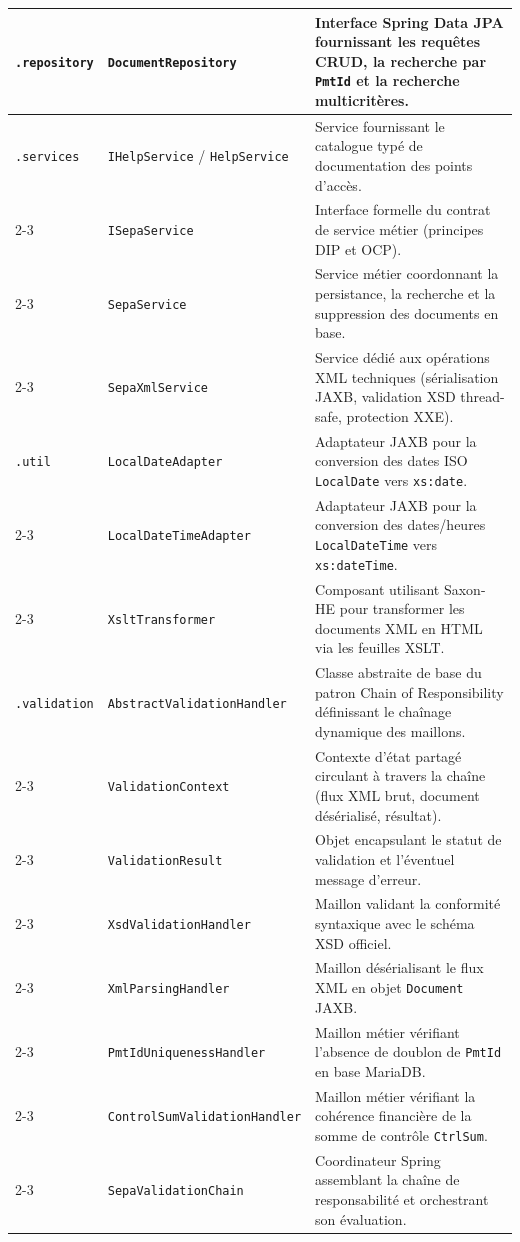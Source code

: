 \documentclass[12pt,a4paper]{article}
\begin{document}
\begin{longtable}{|p{3.8cm}|p{4.6cm}|p{6.8cm}|}
    \texttt{.repository} & \texttt{DocumentRepository} & Interface Spring Data JPA fournissant les requêtes CRUD, la recherche par \texttt{PmtId} et la recherche multicritères. \\
    \hline

    \texttt{.services} & \texttt{IHelpService} / \texttt{HelpService} & Service fournissant le catalogue typé de documentation des points d'accès. \\
    \cline{2-3}
    & \texttt{ISepaService} & Interface formelle du contrat de service métier (principes DIP et OCP). \\
    \cline{2-3}
    & \texttt{SepaService} & Service métier coordonnant la persistance, la recherche et la suppression des documents en base. \\
    \cline{2-3}
    & \texttt{SepaXmlService} & Service dédié aux opérations XML techniques (sérialisation JAXB, validation XSD thread-safe, protection XXE). \\
    \hline

    \texttt{.util} & \texttt{LocalDateAdapter} & Adaptateur JAXB pour la conversion des dates ISO \texttt{LocalDate} vers \texttt{xs:date}. \\
    \cline{2-3}
    & \texttt{LocalDateTimeAdapter} & Adaptateur JAXB pour la conversion des dates/heures \texttt{LocalDateTime} vers \texttt{xs:dateTime}. \\
    \cline{2-3}
    & \texttt{XsltTransformer} & Composant utilisant Saxon-HE pour transformer les documents XML en HTML via les feuilles XSLT. \\
    \hline

    \texttt{.validation} & \texttt{AbstractValidationHandler} & Classe abstraite de base du patron Chain of Responsibility définissant le chaînage dynamique des maillons. \\
    \cline{2-3}
    & \texttt{ValidationContext} & Contexte d'état partagé circulant à travers la chaîne (flux XML brut, document désérialisé, résultat). \\
    \cline{2-3}
    & \texttt{ValidationResult} & Objet encapsulant le statut de validation et l'éventuel message d'erreur. \\
    \cline{2-3}
    & \texttt{XsdValidationHandler} & Maillon validant la conformité syntaxique avec le schéma XSD officiel. \\
    \cline{2-3}
    & \texttt{XmlParsingHandler} & Maillon désérialisant le flux XML en objet \texttt{Document} JAXB. \\
    \cline{2-3}
    & \texttt{PmtIdUniquenessHandler} & Maillon métier vérifiant l'absence de doublon de \texttt{PmtId} en base MariaDB. \\
    \cline{2-3}
    & \texttt{ControlSumValidationHandler} & Maillon métier vérifiant la cohérence financière de la somme de contrôle \texttt{CtrlSum}. \\
    \cline{2-3}
    & \texttt{SepaValidationChain} & Coordinateur Spring assemblant la chaîne de responsabilité et orchestrant son évaluation. \\
    \hline
\end{longtable}
\end{document}
